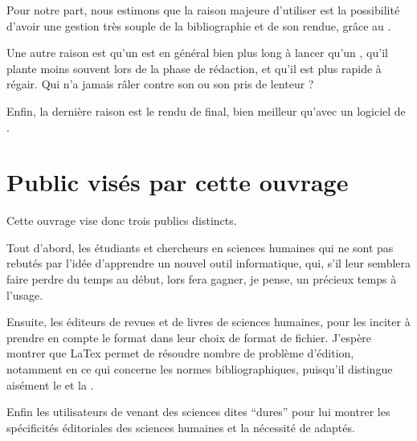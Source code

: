 Pour notre part, nous estimons que la raison majeure d'utiliser  est la possibilité d'avoir une gestion très souple de la bibliographie et de son rendue, grâce au  . 

Une autre raison est qu'un  est en général bien plus long à lancer qu'un , qu'il plante moins souvent lors de la phase de rédaction, et qu'il est plus rapide à régair. Qui n'a jamais râler contre son  ou son  pris de lenteur ?

Enfin, la dernière raison est le rendu de   final, bien meilleur qu'avec un logiciel de .


\section{Public visés par cette ouvrage}

Cette ouvrage vise donc trois publics distincts.

Tout d'abord, les étudiants et chercheurs en sciences humaines qui ne sont pas rebutés par l'idée d'apprendre un nouvel outil informatique, qui, s'il leur semblera faire perdre du temps au début, lors fera gagner, je pense, un précieux temps à l'usage.

Ensuite, les éditeurs de revues et de livres de sciences humaines, pour les inciter à prendre en compte le format  dans leur choix de format de fichier. J'espère montrer que LaTex permet de résoudre nombre de problème d'édition, notamment en ce qui concerne les normes bibliographiques, puisqu'il distingue aisément le  et la .

Enfin les utilisateurs de  venant des sciences dites \enquote{dures} pour lui montrer les spécificités éditoriales des sciences humaines et la nécessité de  adaptés.

